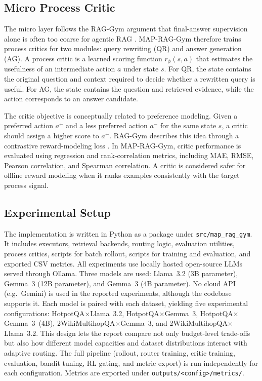 \documentclass[12pt,a4paper]{article}
\begin{document}
\subsection{Micro Process Critic}

The micro layer follows the RAG-Gym argument that final-answer supervision alone is often too coarse for agentic RAG \cite{xiong2025raggym}. MAP-RAG-Gym therefore trains process critics for two modules: query rewriting (QR) and answer generation (AG). A process critic is a learned scoring function $r_\phi(s,a)$ that estimates the usefulness of an intermediate action $a$ under state $s$. For QR, the state contains the original question and context required to decide whether a rewritten query is useful. For AG, the state contains the question and retrieved evidence, while the action corresponds to an answer candidate.

The critic objective is conceptually related to preference modeling. Given a preferred action $a^+$ and a less preferred action $a^-$ for the same state $s$, a critic should assign a higher score to $a^+$. RAG-Gym describes this idea through a contrastive reward-modeling loss \cite{xiong2025raggym}. In MAP-RAG-Gym, critic performance is evaluated using regression and rank-correlation metrics, including MAE, RMSE, Pearson correlation, and Spearman correlation. A critic is considered safer for offline reward modeling when it ranks examples consistently with the target process signal.

\subsection{Experimental Setup}

The implementation is written in Python as a package under \texttt{src/map\_rag\_gym}. It includes executors, retrieval backends, routing logic, evaluation utilities, process critics, scripts for batch rollout, scripts for training and evaluation, and exported CSV metrics. All experiments use locally hosted open-source LLMs served through Ollama. Three models are used: Llama~3.2 (3B parameter), Gemma~3 (12B parameter), and Gemma~3 (4B parameter). No cloud API (e.g.~Gemini) is used in the reported experiments, although the codebase supports it. Each model is paired with each dataset, yielding five experimental configurations: HotpotQA$\times$Llama~3.2, HotpotQA$\times$Gemma~3, HotpotQA$\times$Gemma~3~(4B), 2WikiMultihopQA$\times$Gemma~3, and 2WikiMultihopQA$\times$Llama~3.2. This design lets the report compare not only budget-level trade-offs but also how different model capacities and dataset distributions interact with adaptive routing. The full pipeline (rollout, router training, critic training, evaluation, bandit tuning, RL gating, and metric export) is run independently for each configuration. Metrics are exported under \texttt{outputs/<config>/metrics/}.
\end{document}
